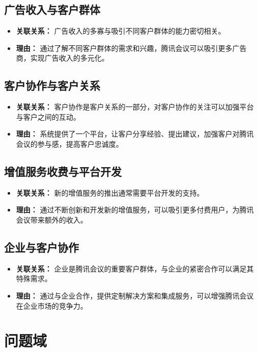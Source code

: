 \documentclass[a4paper,12pt]{article}
\begin{document}
    \subsection{广告收入与客户群体}
    \begin{itemize}
        \item\textbf{关联关系：} 广告收入的多寡与吸引不同客户群体的能力密切相关。
        \item\textbf{理由：} 通过了解不同客户群体的需求和兴趣，腾讯会议可以吸引更多广告商，实现广告收入的多元化。
    \end{itemize}
    \subsection{客户协作与客户关系}
    \begin{itemize}
        \item\textbf{关联关系：} 客户协作是客户关系的一部分，对客户协作的关注可以加强平台与客户之间的互动。
        \item\textbf{理由：} 系统提供了一个平台，让客户分享经验、提出建议，加强客户对腾讯会议的参与感，提高客户忠诚度。
    \end{itemize}
    \subsection{增值服务收费与平台开发}
    \begin{itemize}
        \item\textbf{关联关系：} 新的增值服务的推出通常需要平台开发的支持。
        \item\textbf{理由：} 通过不断创新和开发新的增值服务，可以吸引更多付费用户，为腾讯会议带来额外的收入。
    \end{itemize}
    \subsection{企业与客户协作}
    \begin{itemize}
        \item\textbf{关联关系：} 企业是腾讯会议的重要客户群体，与企业的紧密合作可以满足其特殊需求。
        \item\textbf{理由：} 通过与企业合作，提供定制解决方案和集成服务，可以增强腾讯会议在企业市场的竞争力。
    \end{itemize}

    \section{问题域}
\end{document}
